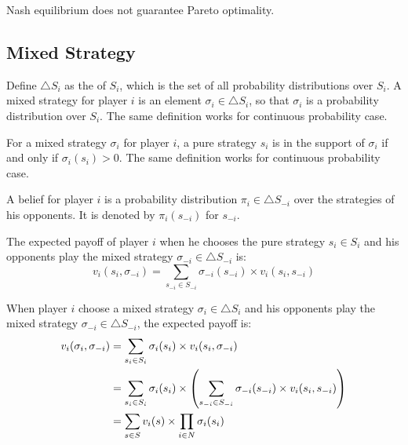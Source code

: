\begin{theorem}
    Nash equilibrium does not guarantee Pareto optimality.    
\end{theorem}





\subsection{Mixed Strategy}

\begin{definition}
    Define $\bigtriangleup S_i$ as the  of $S_i$, which is the set of all probability distributions over $S_i$. A mixed strategy for player $i$ is an element $\sigma_i \in \bigtriangleup S_i$, so that $\sigma_i$ is a probability distribution over $S_i$. The same definition works for continuous probability case.
\end{definition}

\begin{definition}
    For a mixed strategy $\sigma_i$ for player $i$, a pure strategy $s_i$ is in the support of $\sigma_i$ if and only if $\sigma_i (s_i) > 0$. The same definition works for continuous probability case.
\end{definition}

\begin{definition}
    A belief for player $i$ is a probability distribution $\pi_i \in \bigtriangleup S_{-i}$ over the strategies of his opponents. It is denoted by $\pi_i(s_{-i})$ for $s_{-i}$.
\end{definition}

\begin{definition}
    The expected payoff of player $i$ when he chooses the pure strategy $s_i \in S_i$ and his opponents play the mixed strategy $\sigma_{-i} \in \bigtriangleup S_{-i}$ is:
    \begin{equation*}
        v_i(s_i, \sigma_{-i}) = \sum_{s_{-i} \in S_{-i}} \sigma_{-i}(s_{-i}) \times v_i (s_i, s_{-i})
    \end{equation*}
    
    When player $i$ choose a mixed strategy $\sigma_i \in \bigtriangleup S_i$ and his opponents play the mixed strategy $\sigma_{-i} \in \bigtriangleup S_{-i}$, the expected payoff is:
    \begin{equation*}
    \begin{aligned}
        v_i(\sigma_i, \sigma_{-i}) &= \sum_{s_i \in S_i} \sigma_i (s_i) \times v_i(s_i, \sigma_{-i}) \\
        &= \sum_{s_i \in S_i} \sigma_i (s_i)  \times \mleft(\sum_{s_{-i} \in S_{-i}} \sigma_{-i} (s_{-i}) \times v_i (s_i, s_{-i}) \mright) \\
        &= \sum_{s \in S} v_i(s) \times \prod_{i \in N} \sigma_i (s_i)
    \end{aligned}
            \end{equation*}
\end{definition}









